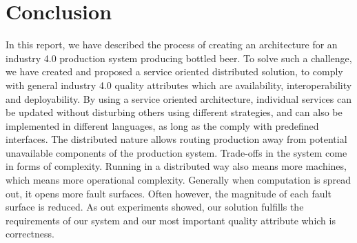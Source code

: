 \section{Conclusion}

In this report, we have described the process of creating an architecture for an industry 4.0 production system producing bottled beer. To solve such a  challenge, we have created and proposed a service oriented distributed solution, to comply with general industry 4.0 quality attributes which are availability, interoperability and deployability. By using a service oriented architecture, individual services can be updated without disturbing others using different strategies, and can also be implemented in different languages, as long as the comply with predefined interfaces. The distributed nature allows routing production away from potential unavailable components of the production system. Trade-offs in the system come in forms of complexity. Running in a distributed way also means more machines, which means more operational complexity. Generally when computation is spread out, it opens more fault surfaces. Often however, the magnitude of each fault surface is reduced. As out experiments showed, our solution fulfills the requirements of our system and our most important quality attribute which is correctness.